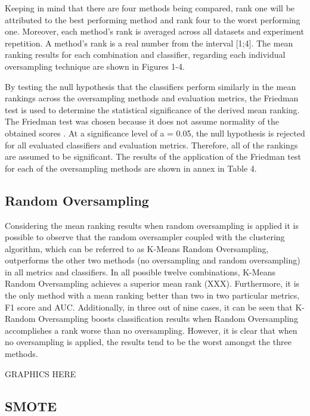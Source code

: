\documentclass[parskip=full]{scrartcl}
\begin{document}
Keeping in mind that there are four methods being compared, rank one will be 
attributed to the best performing method and rank four to the worst performing 
one. Moreover, each method's rank is averaged across all datasets and 
experiment repetition. A method's rank is a real number from the interval 
[1;4]. The mean ranking results for each combination and classifier, regarding 
each individual oversampling technique are shown in Figures 1-4.

By testing the null hypothesis that the classifiers perform similarly in the 
mean rankings across the oversampling methods and evaluation metrics, the 
Friedman test \cite{Friedman1937} is used to determine the statistical 
significance of the derived mean ranking. The Friedman test was chosen because 
it does not assume normality of the obtained scores \cite{Demsar2006}. At a 
significance level of a = 0.05, the null hypothesis is rejected for all 
evaluated classifiers and evaluation metrics. Therefore, all of the rankings 
are assumed to be significant. The results of the application of the Friedman 
test for each of the oversampling methods are shown in annex in Table 4.

\subsection{Random Oversampling}

Considering the mean ranking results when random oversampling is applied it is 
possible to observe that the random oversampler coupled with the clustering 
algorithm, which can be referred to as K-Means Random Oversampling, outperforms 
the other two methods (no oversampling and random oversampling) in all metrics 
and classifiers. In all possible twelve combinations, K-Means Random 
Oversampling achieves a superior mean rank (XXX). Furthermore, it is the only 
method with a mean ranking better than two in two particular metrics, F1 score 
and AUC. Additionally, in three out of nine cases, it can be seen that K-Random 
Oversampling boosts classification results when Random Oversampling 
accomplishes a rank worse than no oversampling. However, it is clear that when 
no oversampling is applied, the results tend to be the worst amongst the three 
methods.

GRAPHICS HERE

\subsection{SMOTE}
\end{document}

